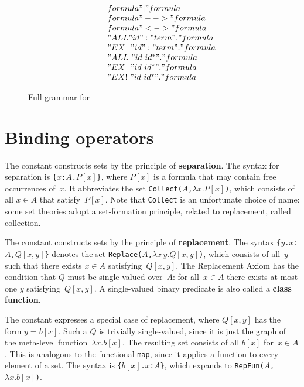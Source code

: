 \begin{figure}
\[\begin{array}{rcl}
         & | & formula " | " formula \\
         & | & formula " --> " formula \\
         & | & formula " <-> " formula \\
         & | & "ALL " id ":" term " . " formula \\
         & | & "EX~~" id ":" term " . " formula \\
         & | & "ALL~" id~id^* " . " formula \\
         & | & "EX~~" id~id^* " . " formula \\
         & | & "EX!~" id~id^* " . " formula
  \end{array}
\]
\caption{Full grammar for {\ZF}} \label{zf-syntax}
\end{figure} 


\section{Binding operators}
The constant  constructs sets by the principle of {\bf
  separation}.  The syntax for separation is \hbox{\tt\{$x$:$A$.$P[x]$\}},
where $P[x]$ is a formula that may contain free occurrences of~$x$.  It
abbreviates the set {\tt Collect($A$,$\lambda x.P[x]$)}, which consists of
all $x\in A$ that satisfy~$P[x]$.  Note that {\tt Collect} is an
unfortunate choice of name: some set theories adopt a set-formation
principle, related to replacement, called collection.

The constant  constructs sets by the principle of {\bf
  replacement}.  The syntax \hbox{\tt\{$y$.$x$:$A$,$Q[x,y]$\}} denotes the
set {\tt Replace($A$,$\lambda x\,y.Q[x,y]$)}, which consists of all~$y$ such
that there exists $x\in A$ satisfying~$Q[x,y]$.  The Replacement Axiom has
the condition that $Q$ must be single-valued over~$A$: for all~$x\in A$
there exists at most one $y$ satisfying~$Q[x,y]$.  A single-valued binary
predicate is also called a {\bf class function}.

The constant  expresses a special case of replacement,
where $Q[x,y]$ has the form $y=b[x]$.  Such a $Q$ is trivially
single-valued, since it is just the graph of the meta-level
function~$\lambda x.b[x]$.  The resulting set consists of all $b[x]$
for~$x\in A$.  This is analogous to the \ML{} functional {\tt map}, since
it applies a function to every element of a set.  The syntax is
\hbox{\tt\{$b[x]$.$x$:$A$\}}, which expands to {\tt RepFun($A$,$\lambda
  x.b[x]$)}.

